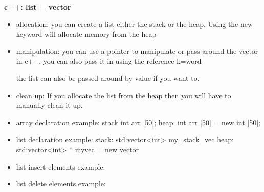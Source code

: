 \documentclass[11pt]{article}
\begin{document}
\textbf{c++: list = vector}
\begin{itemize}
    \item allocation:
        you can create a list either the stack or the heap.
        Using the new keyword will allocate memory from the heap

    \item manipulation:
        you can use a pointer to manipulate or pass around the vector in c++,
        you can also pass it in using the reference k=word

        the list can also be passed around by value if you want to.

    \item clean up:
        If you allocate the list from the heap then you will have to manually
        clean it up.

    \item array declaration example:
        stack
            int arr [50];
        heap:
            int arr [50] = new int [50];

    \item list declaration example:
        stack:
            std:vector<int> my_stack_vec
        heap:
            std:vector<int> * myvec = new vector

    \item list insert elements example:

    \item list delete elements example:
\end{itemize}
\end{document}
